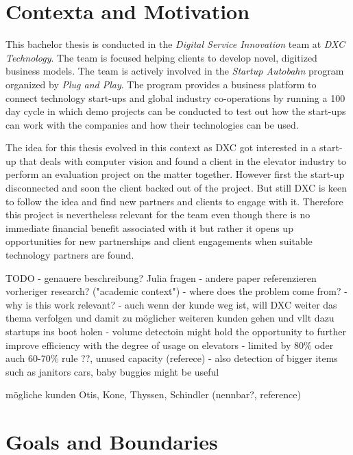 \section{Contexta and Motivation}

This bachelor thesis is conducted in the \emph{Digital Service Innovation} team at \emph{DXC Technology}.
The team is focused helping clients to develop novel, digitized business models.
The team is actively involved in the \emph{Startup Autobahn} program organized by \emph{Plug and Play}.
The program provides a business platform to connect technology start-ups and global industry co-operations 
by running a 100 day cycle in which demo projects can be conducted to test out how the start-ups can work with the companies and how their technologies can be used.

The idea for this thesis evolved in this context as DXC got interested in a start-up that deals with computer vision and found a client in the elevator industry to perform an evaluation project on the matter together.
However first the start-up disconnected and soon the client backed out of the project.
But still DXC is keen to follow the idea and find new partners and clients to engage with it.
Therefore this project is nevertheless relevant for the team even though there is no immediate financial benefit associated with it 
but rather it opens up opportunities for new partnerships and client engagements when suitable technology partners are found.




TODO
- genauere beschreibung? Julia fragen
- andere paper referenzieren vorheriger research? ("academic context")
- where does the problem come from?
- why is this work relevant?
- auch wenn der kunde weg ist, will DXC weiter das thema verfolgen und damit zu möglicher weiteren kunden gehen und vllt dazu startups ins boot holen
- volume detectoin might hold the opportunity to further improve efficiency with the degree of usage on elevators
- limited by 80\% oder auch 60-70\% rule \autocite[][p.~194]{unger2015aufzuege} ??, unused capacity (referece)
- also detection of bigger items such as janitors cars, baby buggies  might be useful


mögliche kunden Otis, Kone, Thyssen, Schindler (nennbar?, reference)

\section{Goals and Boundaries}

